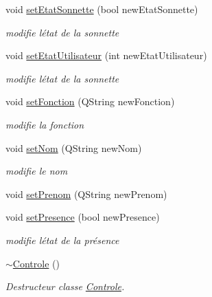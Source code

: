 \begin{DoxyCompactItemize}
void \hyperlink{class_controle_ac706c5e9ede46dab70631281b084e233}{set\+Etat\+Sonnette} (bool new\+Etat\+Sonnette)
\begin{DoxyCompactList}\small\item\em modifie l\textquotesingle{}état de la sonnette \end{DoxyCompactList}\item 
void \hyperlink{class_controle_a62db54114d126d03dd332332b3942320}{set\+Etat\+Utilisateur} (int new\+Etat\+Utilisateur)
\begin{DoxyCompactList}\small\item\em modifie l\textquotesingle{}état de la sonnette \end{DoxyCompactList}\item 
void \hyperlink{class_controle_abe472f4fd197c0fc679539e0b75a6e15}{set\+Fonction} (Q\+String new\+Fonction)
\begin{DoxyCompactList}\small\item\em modifie la fonction \end{DoxyCompactList}\item 
void \hyperlink{class_controle_a0f731cdb733053f7be24e7042611601c}{set\+Nom} (Q\+String new\+Nom)
\begin{DoxyCompactList}\small\item\em modifie le nom \end{DoxyCompactList}\item 
void \hyperlink{class_controle_ab046adc050872b4034c1500eb2e1b728}{set\+Prenom} (Q\+String new\+Prenom)
\item 
void \hyperlink{class_controle_a65904fe693663759a4cde4e4d66e36e8}{set\+Presence} (bool new\+Presence)
\begin{DoxyCompactList}\small\item\em modifie l\textquotesingle{}état de la présence \end{DoxyCompactList}\item 
\hyperlink{class_controle_a98f5d2630efbdb5f469cbb2675725b20}{$\sim$\+Controle} ()
\begin{DoxyCompactList}\small\item\em Destructeur classe \hyperlink{class_controle}{Controle}. \end{DoxyCompactList}\end{DoxyCompactItemize}
